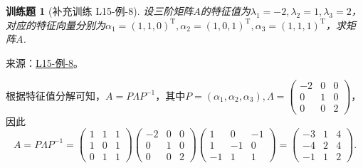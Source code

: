 \documentclass[12pt,fontset=fandol]{ctexart}
\newtheorem{exercise}{训练题}[section]
\begin{document}
\begin{exercise}[补充训练 L15-例-8]\label{prob:L15-例-8}
设三阶矩阵$A$的特征值为$\lambda_1=-2,\lambda_2=1,\lambda_3=2$，对应的特征向量分别为$\alpha_1=(1,1,0)^\mathrm{T},\alpha_2=(1,0,1)^\mathrm{T},\alpha_3=(1,1,1)^\mathrm{T}$，求矩阵$A$.
\end{exercise}
\noindent 来源：\href{https://github.com/yhwu-is/Linear-Algebra-Left-Undone/blob/new/%E8%AE%B2%E4%B9%89/%E4%B8%93%E9%A2%98/15%20%E7%9B%B8%E4%BC%BC%E6%A0%87%E5%87%86%E5%BD%A2%EF%BC%9A%E5%A4%8D%E6%95%B0%E5%9F%9F%E4%B8%8A%E7%9A%84%E5%B0%9D%E8%AF%95%E4%B8%8E%E7%90%86%E8%AE%BA.tex}{L15-例-8}。
\begin{solve}
根据特征值分解可知，$A=P\Lambda P^{-1}$，其中$P=(\alpha_1,\alpha_2,\alpha_3),\Lambda=\begin{pmatrix}
            -2 & 0 & 0 \\
            0  & 1 & 0 \\
            0  & 0 & 2
        \end{pmatrix}$，因此
    \[A=P\Lambda P^{-1}=\begin{pmatrix}
            1 & 1 & 1 \\
            1 & 0 & 1 \\
            0 & 1 & 1
        \end{pmatrix}\begin{pmatrix}
            -2 & 0 & 0 \\
            0  & 1 & 0 \\
            0  & 0 & 2
        \end{pmatrix}\begin{pmatrix}
            1  & 0  & -1 \\
            1  & -1 & 0  \\
            -1 & 1  & 1
        \end{pmatrix}=\begin{pmatrix}
            -3 & 1 & 4 \\
            -4 & 2 & 4 \\
            -1 & 1 & 2
        \end{pmatrix}.\]
\end{solve}
\end{document}
